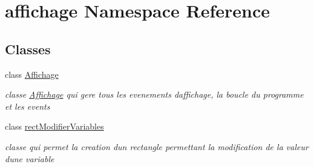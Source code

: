 \hypertarget{namespaceaffichage}{}\section{affichage Namespace Reference}
\label{namespaceaffichage}
\subsection*{Classes}
\begin{DoxyCompactItemize}
\item 
class \hyperlink{classaffichage_1_1_affichage}{Affichage}
\begin{DoxyCompactList}\small\item\em classe \hyperlink{classaffichage_1_1_affichage}{Affichage} qui gere tous les evenements d\textquotesingle{}affichage, la boucle du programme et les events \end{DoxyCompactList}\item 
class \hyperlink{classaffichage_1_1rect_modifier_variables}{rect\+Modifier\+Variables}
\begin{DoxyCompactList}\small\item\em classe qui permet la creation d\textquotesingle{}un rectangle permettant la modification de la valeur d\textquotesingle{}une variable \end{DoxyCompactList}\end{DoxyCompactItemize}
